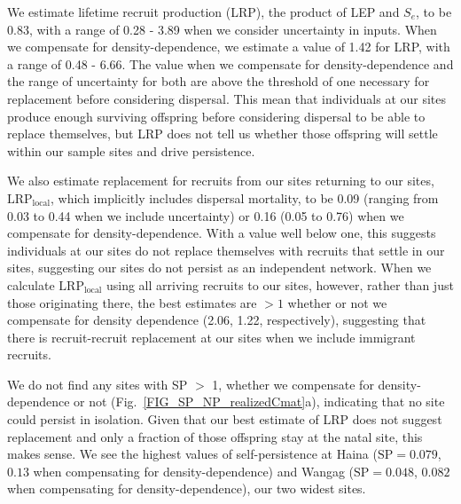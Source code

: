 \documentclass[12pt, oneside]{article}   	%
\begin{document}
We estimate lifetime recruit production (LRP), the product of LEP and $S_e$, to be 0.83, with a range of 0.28 - 3.89 when we consider uncertainty in inputs. When we compensate for density-dependence, we estimate a value of 1.42 for LRP, with a range of 0.48 - 6.66. The value when we compensate for density-dependence and the range of uncertainty for both are above the threshold of one necessary for replacement before considering dispersal. This mean that individuals at our sites produce enough surviving offspring before considering dispersal to be able to replace themselves, but LRP does not tell us whether those offspring will settle within our sample sites and drive persistence. %

We also estimate replacement for recruits from our sites returning to our sites,  $\text{LRP}_\text{local}$, which implicitly includes dispersal mortality, to be 0.09 (ranging from 0.03 to 0.44 when we include uncertainty) or 0.16 (0.05 to 0.76) when we compensate for density-dependence. With a value well below one, this suggests individuals at our sites do not replace themselves with recruits that settle in our sites, suggesting our sites do not persist as an independent network. When we calculate $\text{LRP}_\text{local}$ using all arriving recruits to our sites, however, rather than just those originating there, the best estimates are $> 1$ whether or not we compensate for density dependence (2.06, 1.22, respectively), suggesting that there is recruit-recruit replacement at our sites when we include immigrant recruits.

We do not find any sites with SP $>$ 1, whether we compensate for density-dependence or not (Fig.\ \ref{FIG_SP_NP_realizedCmat}a), indicating that no site could persist in isolation. Given that our best estimate of LRP does not suggest replacement and only a fraction of those offspring stay at the natal site, this makes sense. We see the highest values of self-persistence at Haina ($\text{SP} = 0.079$, $0.13$ when compensating for density-dependence) and Wangag ($\text{SP} = 0.048$, $0.082$ when compensating for density-dependence), our two widest sites. 
\end{document}
